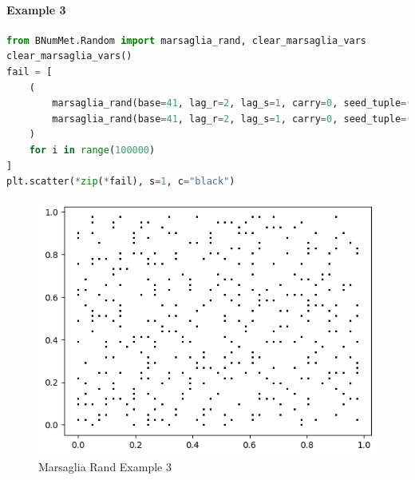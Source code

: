 \paragraph{Example 3}{
\begin{lstlisting}[language=Python]
from BNumMet.Random import marsaglia_rand, clear_marsaglia_vars
clear_marsaglia_vars()
fail = [
    (
        marsaglia_rand(base=41, lag_r=2, lag_s=1, carry=0, seed_tuple=(0, 1)),
        marsaglia_rand(base=41, lag_r=2, lag_s=1, carry=0, seed_tuple=(0, 1)),
    )
    for i in range(100000)
]
plt.scatter(*zip(*fail), s=1, c="black")
\end{lstlisting}
\begin{figure}[H]
    \centering
    \includegraphics{Include/Images/Thesis/Documentation/Randomness/Marsaglia Rand Example 3.png}
    \caption{Marsaglia Rand Example 3}
    \label{fig:Marsaglia Rand Example 3}
\end{figure}
}
